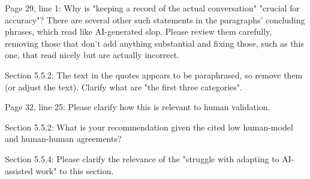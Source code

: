 \documentclass[12pt,english]{reviewresponse}
\begin{document}
\begin{revcomment}
Page 29, line 1: Why is "keeping a record of the actual conversation" "crucial for accuracy"? There are several other such statements in the paragraphs' concluding phrases, which read like AI-generated slop. Please review them carefully, removing those that don't add anything substantial and fixing those, such as this one, that read nicely but are actually incorrect.
\end{revcomment}
\begin{revresponse}
\end{revresponse}

\begin{revcomment}
Section 5.5.2: The text in the quotes appears to be paraphrased, so remove them (or adjust the text). Clarify what are "the first three categories".
\end{revcomment}
\begin{revresponse}
\end{revresponse}

\begin{revcomment}
Page 32, line 25: Please clarify how this is relevant to human validation.
\end{revcomment}
\begin{revresponse}
\end{revresponse}

\begin{revcomment}
Section 5.5.2: What is your recommendation given the cited low human-model and human-human agreements?
\end{revcomment}
\begin{revresponse}
\end{revresponse}

\begin{revcomment}
Section 5.5.4: Please clarify the relevance of the "struggle with adapting to AI-assisted work" to this section.
\end{revcomment}
\begin{revresponse}
\end{revresponse}
\end{document}
